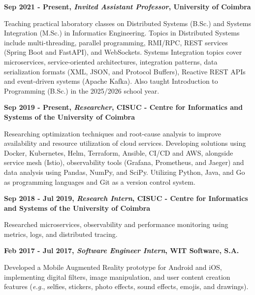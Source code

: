 \documentclass[a4paper,9pt]{memoir}
\newcommand{\SmallSep}{\vspace{0.5em}} %
\newcommand{\CVItem}[2]{ %
    \textbf{\color{RoyalBlue} #1}\par
    #2
    \SmallSep %
}
\begin{document}
\CVItem{Sep 2021 - Present, \textit{Invited Assistant Professor}, University of Coimbra}{
    Teaching practical laboratory classes on Distributed Systems (B.Sc.) and Systems Integration (M.Sc.) in Informatics Engineering. Topics in Distributed Systems include multi-threading, parallel programming, RMI/RPC, REST services (Spring Boot and FastAPI), and WebSockets. Systems Integration topics cover microservices, service-oriented architectures, integration patterns, data serialization formats (XML, JSON, and Protocol Buffers), Reactive REST APIs and event-driven systems (Apache Kafka). Also taught Introduction to Programming (B.Sc.) in the 2025/2026 school year.
}

\CVItem{Sep 2019 - Present, \textit{Researcher}, CISUC - Centre for Informatics and Systems of the University of Coimbra}{
    Researching optimization techniques and root-cause analysis to improve availability and resource utilization of cloud services.
    Developing solutions using Docker, Kubernetes, Helm, Terraform, Ansible, CI/CD and AWS, alongside service mesh (Istio), observability tools (Grafana, Prometheus, and Jaeger) and data analysis using Pandas, NumPy, and SciPy. Utilizing Python, Java, and Go as programming languages and Git as a version control system.
}

\CVItem{Sep 2018 - Jul 2019, \textit{Research Intern}, CISUC - Centre for Informatics and Systems of the University of Coimbra}{
    Researched microservices, observability and performance monitoring using metrics, logs, and distributed tracing.
}

\CVItem{Feb 2017 - Jul 2017, \textit{Software Engineer Intern}, WIT Software, S.A.}{
    Developed a Mobile Augmented Reality prototype for Android and iOS, implementing digital filters, image manipulation, and user content creation features (\textit{e.g.}, selfies, stickers, photo effects, sound effects, emojis, and drawings).

}



\end{document}
